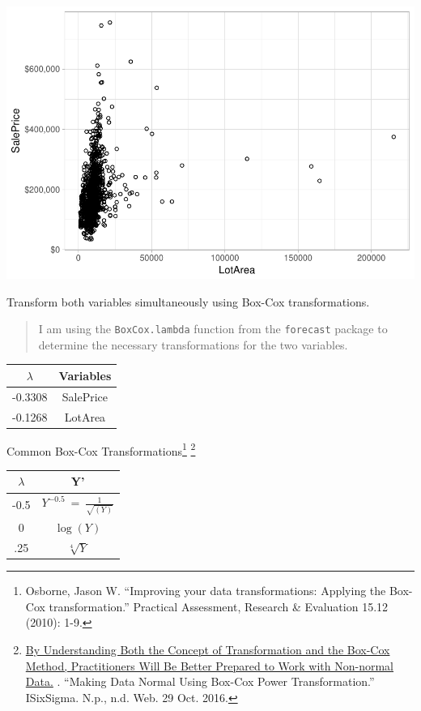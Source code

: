 \documentclass[]{article}
\let\rmarkdownfootnote\footnote%
\def\footnote{\protect\rmarkdownfootnote}
\begin{document}
\includegraphics{Final_Project_files/figure-latex/scatter plot-1.pdf}

Transform both variables simultaneously using Box-Cox transformations.

\begin{quote}
I am using the \texttt{BoxCox.lambda} function from the
\texttt{forecast} package to determine the necessary transformations for
the two variables.
\end{quote}

\begin{longtable}[]{@{}cc@{}}
\toprule
\(\lambda\) & Variables\tabularnewline
\midrule
\endhead
-0.3308 & SalePrice\tabularnewline
-0.1268 & LotArea\tabularnewline
\bottomrule
\end{longtable}

\centering

Common Box-Cox Transformations\footnote{Osborne, Jason W. ``Improving
  your data transformations: Applying the Box-Cox transformation.''
  Practical Assessment, Research \& Evaluation 15.12 (2010): 1-9.}
\footnote{\href{https://www.isixsigma.com/tools-templates/normality/making-data-normal-using-box-cox-power-transformation/}{By
  Understanding Both the Concept of Transformation and the Box-Cox
  Method, Practitioners Will Be Better Prepared to Work with Non-normal
  Data.} . ``Making Data Normal Using Box-Cox Power Transformation.''
  ISixSigma. N.p., n.d. Web. 29 Oct. 2016.}

\setlength{\tabcolsep}{12pt}

\begin{tabular}{ c c }
\hline
$\lambda$ & Y' \\ \hline
-0.5 &  $Y^{-0.5}~=~\frac{1}{\sqrt{(Y)}}$ \\
0   & $\log(Y)$ \\
.25  & $\sqrt[4]{Y}$
\end{tabular}
\end{document}
